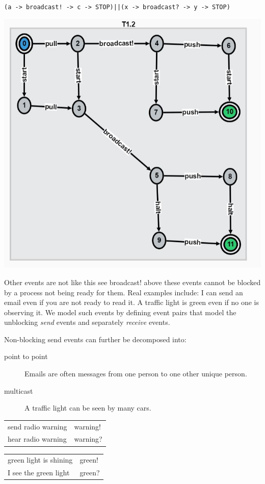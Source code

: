 \documentclass[]{article}
\begin{document}
\begin{center}\verb$(a -> broadcast! -> c -> STOP)||(x -> broadcast? -> y -> STOP)$
	
	\includegraphics[scale=0.5]{bcast.jpg} \end{center}

Other events are not like this see {\sf broadcast!}  above these events cannot be blocked by a process not being ready for them. Real examples include:  I can send an email even if you are not ready to read it. A traffic light  is green even if no one is observing it.  We  model such events by defining event pairs  that model the unblocking \emph{send} events and separately \emph{receive} events.

Non-blocking send events can further be decomposed into:
\begin{description}
\item[point to point] Emails are often messages from one person to one other  unique person.
\item[multicast] A traffic light can be seen by many cars.
\end{description}

\hspace{\fill}
\begin{tabular}{ll}
send radio warning & {\sf warning!} \\
hear radio warning & {\sf warning?}
\end{tabular} \hspace{\fill}
\begin{tabular}{ll}
green light is shining  & {\sf green!} \\
I see the green light & {\sf green?}
\end{tabular}
\hspace{\fill}
\end{document}
